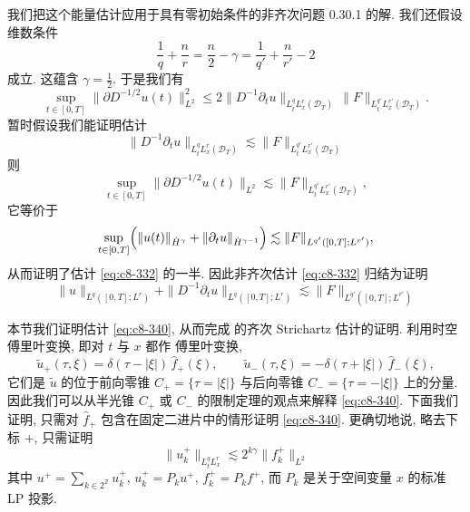 我们把这个能量估计应用于具有零初始条件的非齐次问题 0.30.1 的解. 我们还假设维数条件
\[
\frac{1}{q}+\frac{n}{r}=\frac{n}{2}-\gamma=\frac{1}{q'}+\frac{n}{r'}-2
\]
成立. 这蕴含 $\gamma=\frac{1}{2}$. 于是我们有
\[
\sup_{t\in[0, T]}\|\partial D^{-1/2}u(t)\|_{L^2}^2
\leq 2\|D^{-1}\partial_t u\|_{L_t^q L_x^r(\mathcal{D}_T)}\, \|F\|_{L_t^{q'} L_x^{r'}(\mathcal{D}_T)} .
\]
暂时假设我们能证明估计
\begin{equation}
\|D^{-1}\partial_t u\|_{L_t^q L_x^r(\mathcal{D}_T)}\lesssim\|F\|_{L_t^{q'} L_x^{r'}(\mathcal{D}_T)}\label{eq:c8-344}
\end{equation}
则
\[
\sup_{t\in[0, T]}\|\partial D^{-1/2}u(t)\|_{L^2}\lesssim\|F\|_{L_t^{q'} L_x^{r'}(\mathcal{D}_T)}, 
\]
它等价于
\[
\sup_{t\in[0, T]}\Bigl(\|u(t)\|_{\dot{H}^\gamma}+\|\partial_t u\|_{\dot{H}^{\gamma-1}}\Bigr)\lesssim\|F\|_{L^{q'}([0, T];L^{r'})}, 
\]
从而证明了估计 \eqref{eq:c8-332} 的一半. 因此非齐次估计 \eqref{eq:c8-332} 归结为证明
\begin{equation}
\|u\|_{L^q([0, T];L^r)}+\|D^{-1}\partial_t u\|_{L^q([0, T];L^r)}\lesssim\|F\|_{L^{q'}([0, T];L^{r'})}\label{eq:c8-345}
\end{equation}


本节我们证明估计 \eqref{eq:c8-340}, 从而完成 的齐次 Strichartz 估计的证明. 利用时空 傅里叶变换, 即对 $t$ 与 $x$ 都作 傅里叶变换, 
\begin{equation}
\widetilde{u}_{+}(\tau, \xi)=\delta(\tau-|\xi|)\, \widehat{f}_{+}(\xi), \qquad
\widetilde{u}_{-}(\tau, \xi)=-\delta(\tau+|\xi|)\, \widehat{f}_{-}(\xi), \label{eq:c8-346}
\end{equation}
它们是 $\widetilde{u}$ 的位于前向零锥 $C_{+}=\{\tau=|\xi|\}$ 与后向零锥 $C_{-}=\{\tau=-|\xi|\}$ 上的分量. 因此我们可以从半光锥 $C_{+}$ 或 $C_{-}$ 的限制定理的观点来解释 \eqref{eq:c8-340}. 下面我们证明, 只需对 $\widehat{f}_{+}$ 包含在固定二进片中的情形证明 \eqref{eq:c8-340}. 更确切地说, 略去下标 $+$, 只需证明
\begin{equation}
\|u_{k}^{+}\|_{L_t^q L_x^r}\lesssim 2^{k\gamma}\|f_{k}^{+}\|_{L^2}\label{eq:c8-347}
\end{equation}
其中 $u^{+}=\sum_{k\in2^{\mathbb{Z}}}u_{k}^{+}$, $u_{k}^{+}=P_k u^{+}$, $f_{k}^{+}=P_k f^{+}$, 而 $P_k$ 是关于空间变量 $x$ 的标准 LP 投影. 

